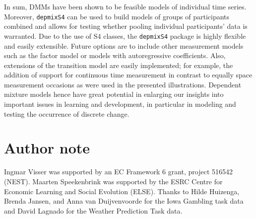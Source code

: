 \documentclass[a4paper,12pt,man]{apa} %
\newcommand{\pkg}{\texttt}
\begin{document}
In sum, DMMs have been shown to be feasible models of individual time
series.  Moreover, \pkg{depmixS4} can be used to build models of
groups of participants combined and allows for testing whether pooling
individual participants' data is warranted.  Due to the use of S4
classes, the \pkg{depmixS4} package is highly flexible and easily
extensible.  Future options are to include other measurement models
such as the factor model or models with autoregressive coefficients.
Also, extensions of the transition model are easily implemented; for
example, the addition of support for continuous time measurement in
contrast to equally space measurement occasions as were used in the
presented illustrations.  Dependent mixture models hence have great
potential in enlarging our insights into important issues in learning
and development, in particular in modeling and testing the occurrence
of discrete change.

\newpage

\section*{Author note}

Ingmar Visser was supported by an EC Framework 6 grant, project 516542
(NEST).  Maarten Speekenbrink was supported by the ESRC Centre for
Economic Learning and Social Evolution (ELSE).  Thanks to Hilde
Huizenga, Brenda Jansen, and Anna van Duijvenvoorde for the Iowa
Gambling task data and David Lagnado for the Weather Prediction Task
data.


\end{document}
